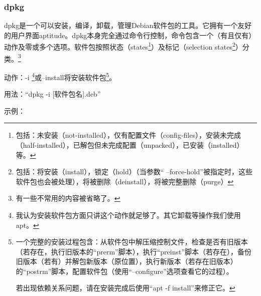 \documentclass{book}
\begin{document}
\subsubsection{dpkg}
\cite{mandpkg}\par
dpkg是一个可以安装，编译，卸载，管理Debian软件包的工具。它拥有一个友好的用户界面aptitude。dpkg本身完全通过命令行控制，命令包含一个（有且仅有）动作及零或多个选项。软件包按照状态（states\footnote{包括：未安装（not-installed），仅有配置文件（config-files），安装未完成（half-installed），已解包但未完成配置（unpacked），已安装（installed）等。}）及标记（selection states\footnote{包括：将安装（install），锁定（hold）（当参数“ --force-hold”被指定时，这些软件包也会被处理），将被删除（deinstall），将被完整删除（purge）}）分类。\footnote{有一些不常用的内容被省略了。}\par
动作：-i \footnote{我认为安装软件包方面只讲这个动作就足够了。其它卸载等操作我们使用apt。}或--install将安装软件包\footnote{一个完整的安装过程包含：从软件包中解压缩控制文件，检查是否有旧版本（若存在，执行旧版本的“prerm”脚本），执行“preinst”脚本（若存在），备份旧版本（若有）并解包新版本（原位置），执行新版本（若存在旧版本）的“postrm”脚本，配置软件包（使用“--configure”选项查看它的过程）。\par 若出现依赖关系问题，请在安装完成后使用“apt -f install”来修正它。}。\par
用法：“dpkg -i [软件包名].deb”\par
示例：
\end{document}
